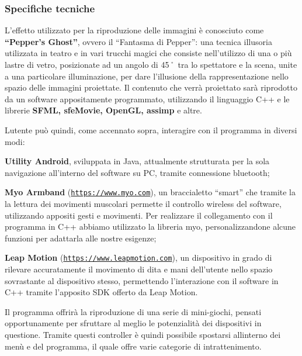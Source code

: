 \subsubsection*{Specifiche tecniche}

L’effetto utilizzato per la riproduzione delle immagini è conosciuto come {\bfseries “\+Pepper’s Ghost”}, ovvero il “\+Fantasma di Pepper”\+: una tecnica illusoria utilizzata in teatro e in vari trucchi magici che consiste nell’utilizzo di una o più lastre di vetro, posizionate ad un angolo di 45˚ tra lo spettatore e la scena, unite a una particolare illuminazione, per dare l’illusione della rappresentazione nello spazio delle immagini proiettate. Il contenuto che verrà proiettato sarà riprodotto da un software appositamente programmato, utilizzando il linguaggio C++ e le librerie {\bfseries S\+F\+ML, sfe\+Movie, Open\+GL, assimp} e altre.

L\textquotesingle{}utente può quindi, come accennato sopra, interagire con il programma in diversi modi\+:
\begin{DoxyItemize}
\item {\bfseries Utility Android}, sviluppata in Java, attualmente strutturata per la sola navigazione all’interno del software su PC, tramite connessione bluetooth;
\item {\bfseries Myo Armband} (\href{https://www.myo.com}{\tt https\+://www.\+myo.\+com}), un braccialetto “smart” che tramite la la lettura dei movimenti muscolari permette il controllo wireless del software, utilizzando appositi gesti e movimenti. Per realizzare il collegamento con il programma in C++ abbiamo utilizzato la libreria myo, personalizzandone alcune funzioni per adattarla alle nostre esigenze;
\item {\bfseries Leap Motion} (\href{https://www.leapmotion.com}{\tt https\+://www.\+leapmotion.\+com}), un dispositivo in grado di rilevare accuratamente il movimento di dita e mani dell’utente nello spazio sovrastante al dispositivo stesso, permettendo l’interazione con il software in C++ tramite l’apposito S\+DK offerto da Leap Motion.
\end{DoxyItemize}

Il programma offrirà la riproduzione di una serie di mini-\/giochi, pensati opportunamente per sfruttare al meglio le potenzialità dei dispositivi in questione. Tramite questi controller è quindi possibile spostarsi all\textquotesingle{}interno dei menù e del programma, il quale offre varie categorie di intrattenimento.

